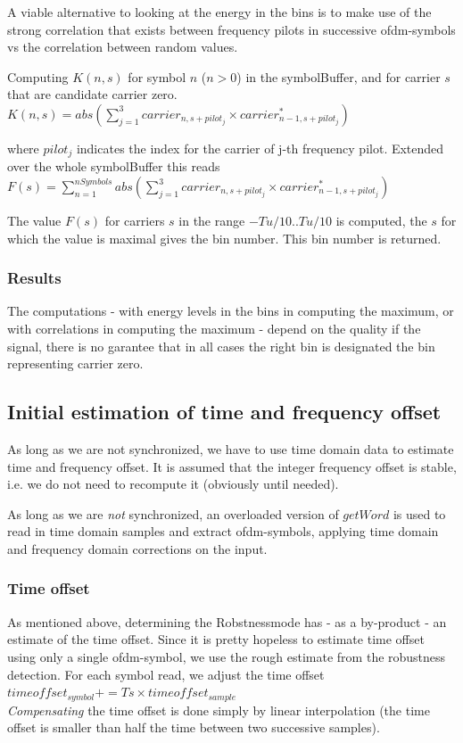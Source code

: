 \documentclass[11pt]{article}
\begin{document}
A viable alternative to looking at the energy in the bins
is to make use of the strong correlation that exists between frequency
pilots in successive ofdm-symbols vs the correlation between random values.

Computing $K (n, s)$ for symbol $n$ ($n > 0$) in the symbolBuffer, and
for carrier $s$ that are candidate carrier zero.
{
\ \\
$K (n, s) = abs (\sum_{j=1}^{3} carrier_{n, s + pilot_j} \times carrier_{n -1, s + pilot_j}^*) $
\ \\
}

where $pilot_j$ indicates the index for the carrier of j-th frequency pilot.
Extended over the whole symbolBuffer this reads
{
\ \\
$F (s) = \sum_{n=1}^{nSymbols} abs (\sum_{j=1}^{3} carrier_{n, s + pilot_j} \times carrier_{n -1, s + pilot_j}^*) $
\ \\
}

The value $F (s)$ for carriers $s$ in the range $-Tu / 10 .. Tu / 10$  is
computed, the $s$  for which the value is maximal gives the bin number.
This bin number is returned.

\subsubsection{Results}
The computations - with energy levels in the bins in computing
the maximum, or with correlations in computing the maximum -
depend on the quality if the signal,
there is no garantee that in all cases the right bin
is designated the bin representing carrier zero.

\subsection{Initial estimation of time and frequency offset}
As long as we are not synchronized, we have to use time domain data
to estimate time and frequency offset.
It is assumed that the integer frequency offset is stable, i.e. we
do not need to recompute it (obviously until needed).

As long as we are {\em not} synchronized, an overloaded version of $getWord$
is used to read in time domain samples and extract ofdm-symbols,
applying time domain and frequency domain corrections on the input.
\subsubsection{Time offset}
As mentioned above, determining the Robstnessmode has - as a by-product - an
estimate of the time offset. Since it is pretty hopeless to
estimate time offset using only a single ofdm-symbol,
we use the rough estimate
from the robustness detection.
For each symbol read, we adjust the time offset
{
\ \\
$timeoffset_{symbol} += Ts \times timeoffset_{sample}$
\ \\
}
{\em Compensating} the time offset is  done simply by linear interpolation
(the time offset is smaller than half the time between two successive samples).
\end{document}

